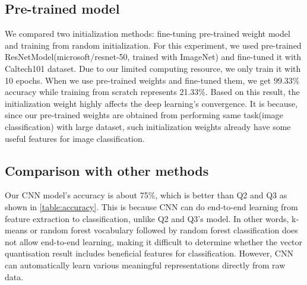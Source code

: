 \subsection{Pre-trained model}
We compared two initialization methods: fine-tuning pre-trained weight model and training from random initialization. For this experiment, we used pre-trained ResNetModel(microsoft/resnet-50, trained with ImageNet)\cite{ref1} and fine-tuned it with Caltech101 dataset. Due to our limited computing resource, we only train it with 10 epochs. When we use pre-trained weights and fine-tuned them, we get 99.33\% accuracy while training from scratch represents 21.33\%. Based on this result, the initialization weight highly affects the deep learning's convergence. It is because, since our pre-trained weights are obtained from performing same task(image classification) with large dataset, such initialization weights already have some useful features for image classification. 

\subsection{Comparison with other methods}
Our CNN model's accuracy is about 75\%, which is better than Q2 and Q3 as shown in \cref{table:accuracy}. This is because CNN can do end-to-end learning from feature extraction to classification, unlike Q2 and Q3's model. In other words, k-means or random forest vocabulary followed by random forest classification does not allow end-to-end learning, making it difficult to determine whether the vector quantisation result includes beneficial features for classification. However, CNN can automatically learn various meaningful representations directly from raw data.

\begin{table}[htbp]
	\centering
	\setlength{\tabcolsep}{6pt} %
	\renewcommand{\arraystretch}{1.5} %
	\caption{Accuracy of Models}
	\label{table:accuracy}
\end{table}